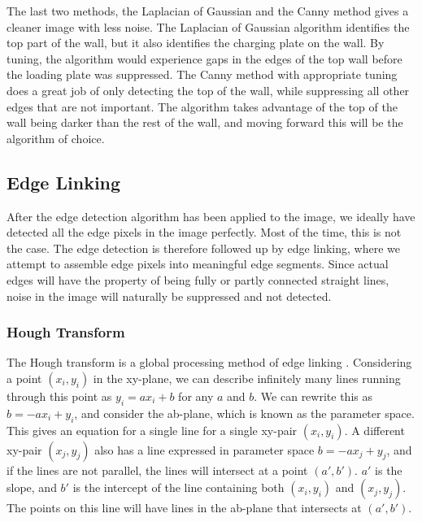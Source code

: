 The last two methods, the Laplacian of Gaussian and the Canny method gives a cleaner image with less noise. The Laplacian of Gaussian algorithm identifies the top part of the wall, but it also identifies the charging plate on the wall. By tuning, the algorithm would experience gaps in the edges of the top wall before the loading plate was suppressed. The Canny method with appropriate tuning does a great job of only detecting the top of the wall, while suppressing all other edges that are not important. The algorithm takes advantage of the top of the wall being darker than the rest of the wall, and moving forward this will be the algorithm of choice.

\subsection{Edge Linking}

After the edge detection algorithm has been applied to the image, we ideally have detected all the edge pixels in the image perfectly. Most of the time, this is not the case. The edge detection is therefore followed up by edge linking, where we attempt to assemble edge pixels into meaningful edge segments. Since actual edges will have the property of being fully or partly connected straight lines, noise in the image will naturally be suppressed and not detected. 

\subsubsection{Hough Transform}\label{ch:hough}
The Hough transform is a global processing method of edge linking \cite{hough}.  Considering a point $(x_i,y_i)$ in the xy-plane, we can describe infinitely many lines running through this point as $y_i = ax_i + b$ for any $a$ and $b$. We can rewrite this as $b = -ax_i + y_i$, and consider the ab-plane, which is known as the parameter space. This gives an equation for a single line for a single xy-pair $(x_i,y_i)$. A different xy-pair $(x_j,y_j)$ also has a line expressed in parameter space $b = -ax_j + y_j$, and if the lines are not parallel, the lines will intersect at a point $(a',b')$. $a'$ is the slope, and $b'$ is the intercept of the line containing both $(x_i,y_i)$ and $(x_j,y_j)$. The points on this line will have lines in the ab-plane that intersects at $(a',b')$.\\

